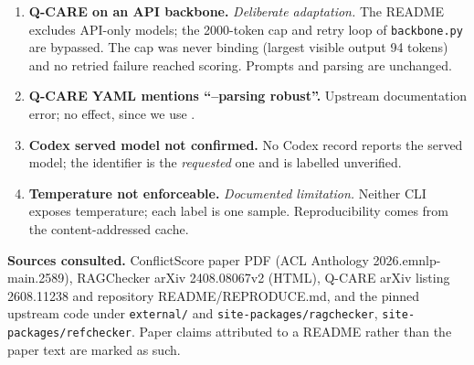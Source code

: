 \documentclass[11pt,a4paper]{article}
\newcommand{\code}[1]{\texttt{\detokenize{#1}}}
\DeclareRobustCommand{\src}[1]{{\small\nolinkurl{#1}}}
\begin{document}
\begin{enumerate}[label=\textbf{D\arabic*}, ref=D\arabic*, leftmargin=2.2em]
\item\label{d:qc-backbone} \textbf{Q-CARE on an API backbone.} \emph{Deliberate adaptation.} The README excludes API-only models; the 2000-token cap and retry loop of \src{backbone.py} are bypassed. The cap was never binding (largest visible output 94 tokens) and no retried failure reached scoring. Prompts and parsing are unchanged.
\item\label{d:qc-yaml} \textbf{Q-CARE YAML mentions ``--parsing robust''.} Upstream documentation error; no effect, since we use \code{paper}.
\item\label{d:judge-id} \textbf{Codex served model not confirmed.} No Codex record reports the served model; the identifier is the \emph{requested} one and is labelled unverified.
\item\label{d:temp} \textbf{Temperature not enforceable.} \emph{Documented limitation.} Neither CLI exposes temperature; each label is one sample. Reproducibility comes from the content-addressed cache.
\end{enumerate}

\vspace{1em}
\noindent\textbf{Sources consulted.}
ConflictScore paper PDF (ACL Anthology 2026.emnlp-main.2589), RAGChecker arXiv 2408.08067v2 (HTML), Q-CARE arXiv listing 2608.11238 and repository README/REPRODUCE.md, and the pinned upstream code under \src{external/} and \src{site-packages/ragchecker}, \src{site-packages/refchecker}. Paper claims attributed to a README rather than the paper text are marked as such.
\end{document}

